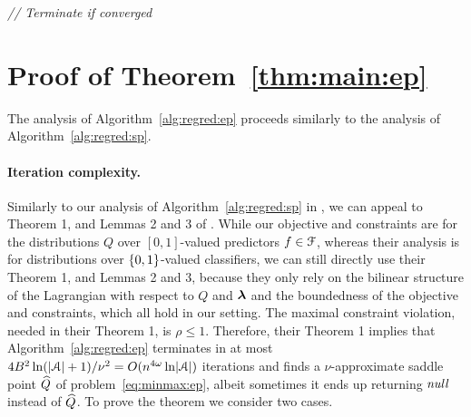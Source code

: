 \begin{algorithm}[t]
\begin{algorithmic}[1]
\medskip
    \If{$\max\set{\overline{\nu},\underline{\nu}}\le\nu$}
           \hfill \textit{// Terminate if converged}
    \smallskip
        \Else
        \EndIf
    \EndIf
\medskip
    \EndFor
\end{algorithmic}
\end{algorithm}


\section{Proof of Theorem~\ref{thm:main:ep}}

The analysis of Algorithm~\ref{alg:regred:ep} proceeds similarly to the analysis of Algorithm~\ref{alg:regred:sp}.

\paragraph{Iteration complexity.} Similarly to our analysis of Algorithm~\ref{alg:regred:sp} in ,
we can appeal to Theorem 1, and Lemmas 2 and 3 of \citet{agarwal2018reductions}. While our objective and constraints are for the distributions $Q$ over $[0,1]$-valued predictors $f\in\mathcal{F}$, whereas their analysis is for distributions over $\{0,1\}$-valued classifiers, we can still directly use their Theorem 1, and Lemmas 2 and 3, because they only rely on the bilinear structure of the Lagrangian with respect to $Q$ and $\boldsymbol{\lambda}$ and the boundedness of the objective and constraints, which all hold in our setting. The maximal constraint violation, needed in their Theorem 1, is $\rho\le 1$. Therefore, their Theorem 1 implies that Algorithm~\ref{alg:regred:ep} terminates in at most $4B^2\ln(\lvert\mathcal{A}\rvert + 1)/\nu^2=O(n^{4\omega}\ln\lvert\mathcal{A}\rvert)$ iterations and
finds a $\nu$-approximate saddle point $\widehat{Q}$ of problem~\eqref{eq:minmax:ep}, albeit sometimes it ends up returning $\textit{\mdseries null}$ instead of $\widehat{Q}$. To prove the theorem we consider two cases.

